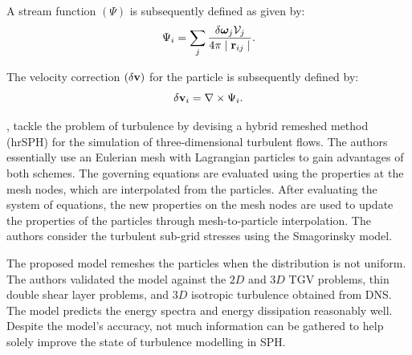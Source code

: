 A stream function $(\Psi)$ is subsequently defined as given by:
\begin{equation}
    \Psi_i = \sum_j \frac{\delta \Vorticity_j \Vol_j}{4\pi \RtwoIJ[]}.
    \label{eq:Liu2019-stream-func}
\end{equation}

The velocity correction $(\delta \mathbf{v})$ for the particle is subsequently defined by:
\begin{equation}
    \delta \vect{v}_i = \nabla \times \Psi_i.
    \label{eq:Liu2019-vel-update}
\end{equation}

\cite{Obeidat2018}, tackle the problem of turbulence by devising a hybrid remeshed method (hrSPH)
for the simulation of three-dimensional turbulent flows. 
The authors essentially use an Eulerian mesh with Lagrangian particles to gain advantages of both schemes. The governing equations are evaluated using the properties at the mesh nodes, which are interpolated from the particles. After evaluating the system of equations, the new properties on the mesh nodes are used to update the properties of the particles through mesh-to-particle interpolation. The authors consider the turbulent sub-grid stresses using the Smagorinsky model.

The proposed model remeshes the particles when the distribution is not uniform. The authors validated the model against the $2D$ and $3D$ TGV problems, thin double shear layer problems, and $3D$ isotropic turbulence obtained from DNS. The model predicts the energy spectra and energy dissipation reasonably well. Despite the model’s accuracy, not much information can be gathered to help solely improve the state of turbulence modelling in SPH.